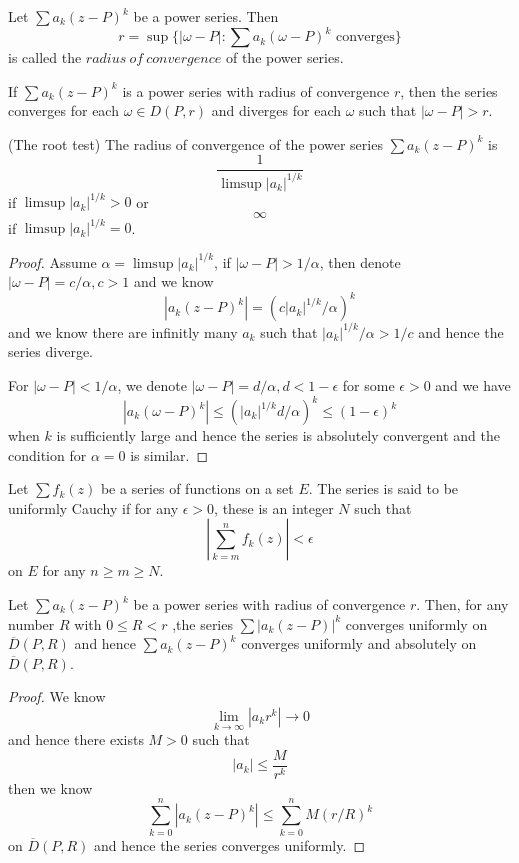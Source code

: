\documentclass[lang=en, color=blue, ]{elegantbook}
\begin{document}
\begin{definition}
    Let $\sum a_k(z-P)^k$ be a power series. Then
    \[r = \sup\{|\omega-P|:\sum a_k(\omega-P)^k\text{ converges}\}\]
    is called the $radius\ of\ convergence$ of the power series.
\end{definition}

\begin{lemma}
    If $\sum a_k(z-P)^k$ is a power series with radius of convergence $r$, then the series converges for each $\omega \in D({P,r})$ and diverges for each $\omega$ such that $|\omega-P|>r$.
\end{lemma}

\begin{lemma}
    (The root test) The radius of convergence of the power series $\sum a_k(z-P)^k$ is
    \[\dfrac{1}{\limsup |a_k|^{1/k}}\]
    if $\limsup |a_k|^{1/k} > 0$ or
    \[\infty\]
    if $\limsup |a_k|^{1/k} = 0$.
\end{lemma}
\begin{proof}\par
    Assume $\alpha = \limsup |a_k|^{1/k}$, if $|\omega-P|>1/\alpha$, then denote $|\omega-P| = c/\alpha,c>1$ and we know
    \[
    |a_k(z-P)^k| = (c|a_k|^{1/k}/\alpha)^k
    \]    
    and we know there are infinitly many $a_k$ such that $|a_k|^{1/k}/\alpha > 1/c$ and hence the series diverge.\par
    For $|\omega-P|<1/\alpha$, we denote $|\omega-P| = d/\alpha, d<1-\epsilon$ for some $\epsilon >0$ and we have
    \[
    |a_k(\omega-P)^k| \leq (|a_k|^{1/k}d/\alpha)^k \leq (1-\epsilon)^k 
    \]
    when $k$ is sufficiently large and hence the series is absolutely convergent and the condition for $\alpha = 0$ is similar.
\end{proof}

\begin{definition}
    Let $\sum f_k(z)$ be a series of functions on a set $E$. The series is said to be uniformly Cauchy if for any $\epsilon > 0$, these is an integer $N$ such that
    \[
    |\sum\limits_{k=m}^{n} f_k(z)| <\epsilon
    \]
    on $E$ for any $n\geq m \geq N$.
\end{definition}

\begin{proposition}
    Let $\sum a_k(z-P)^k$ be a power series with radius of convergence $r$. Then, for any number $R$ with $0 \leq R < r$ ,the series $\sum |a_k(z-P)|^k$ converges uniformly on $\overline{D}(P,R)$ and hence $\sum a_k(z-P)^k$ converges uniformly and absolutely on $\overline{D}(P,R)$.
\end{proposition}
\begin{proof}
    We know
    \[\lim_{k\to\infty}|a_kr^k| \to 0\]
    and hence there exists $M>0$ such that
    \[|a_k| \leq \dfrac{M}{r^k}\]
    then we know
    \[
    \sum\limits_{k=0}^{n}|a_k(z-P)^k| \leq \sum\limits_{k=0}^n M(r/R)^k
    \]
    on $\overline{D}(P,R)$ and hence the series converges uniformly.
\end{proof}
\end{document}
